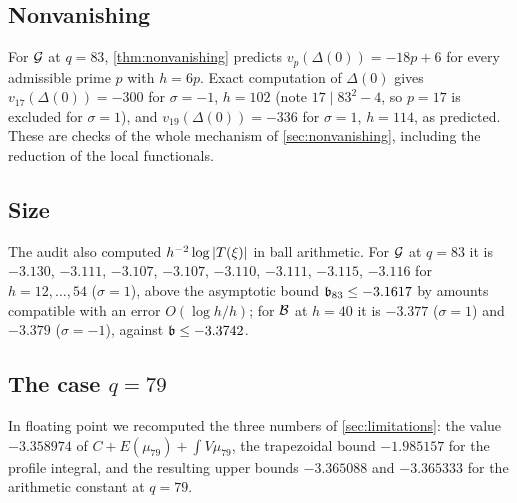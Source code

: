 \subsection{Nonvanishing}
For $\mathcal{G}$ at $q=83$, \cref{thm:nonvanishing} predicts $v_p(\Delta(0))=-18p+6$ for every
admissible prime $p$ with $h=6p$. Exact computation of $\Delta(0)$ gives $v_{17}(\Delta(0))=-300$
for $\sigma=-1$, $h=102$ (note $17\mid83^2-4$, so $p=17$ is excluded for $\sigma=1$), and
$v_{19}(\Delta(0))=-336$ for $\sigma=1$, $h=114$, as predicted. These are checks of the whole
mechanism of \cref{sec:nonvanishing}, including the reduction of the local functionals.

\subsection{Size}
The audit also computed $h^{-2}\log\left\lvert T(\xi)\right\rvert$ in ball arithmetic. For $\mathcal{G}$ at $q=83$ it is
$-3.130$, $-3.111$, $-3.107$, $-3.107$, $-3.110$, $-3.111$, $-3.115$, $-3.116$ for
$h=12,\dots,54$ ($\sigma=1$), above the asymptotic bound $\mathfrak{b}_{83}\le-3.1617$ by amounts
compatible with an error $O(\log h/h)$; for $\mathcal{B}$ at $h=40$ it is $-3.377$ ($\sigma=1$) and
$-3.379$ ($\sigma=-1$), against $\mathfrak{b}\le-3.3742$.

\subsection{The case \texorpdfstring{$q=79$}{q = 79}}
In floating point we recomputed the three numbers of \cref{sec:limitations}: the value
$-3.358974$ of $C+E(\mu_{79})+\int V\mu_{79}$, the trapezoidal bound $-1.985157$ for the profile
integral, and the resulting upper bounds $-3.365088$ and $-3.365333$ for the arithmetic
constant at $q=79$.

